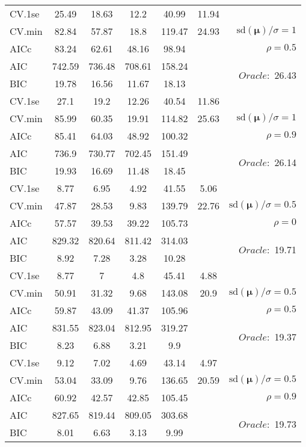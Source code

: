 \begin{table}
\begin{center}
\begin{tabular}{l*{5}{c}|r}
 \hline 
CV.1se & 25.49 & 18.63 & 12.2 & 40.99 & 11.94 & \\
CV.min & 82.84 & 57.87 & 18.8 & 119.47 & 24.93 &  $\mathrm{sd}(\mathbf{\mu})/\sigma=1$ \\
AICc & 83.24 & 62.61 & 48.16 & 98.94 & & $\rho=0.5$ \\
AIC & 742.59 & 736.48 & 708.61 & 158.24 & &  \multirow{2}{*}{$Oracle: $ 26.43} \\
BIC & 19.78 & 16.56 & 11.67 & 18.13 & &  \\
 \hline 
CV.1se & 27.1 & 19.2 & 12.26 & 40.54 & 11.86 & \\
CV.min & 85.99 & 60.35 & 19.91 & 114.82 & 25.63 &  $\mathrm{sd}(\mathbf{\mu})/\sigma=1$ \\
AICc & 85.41 & 64.03 & 48.92 & 100.32 & & $\rho=0.9$ \\
AIC & 736.9 & 730.77 & 702.45 & 151.49 & &  \multirow{2}{*}{$Oracle: $ 26.14} \\
BIC & 19.93 & 16.69 & 11.48 & 18.45 & &  \\
 \hline 
CV.1se & 8.77 & 6.95 & 4.92 & 41.55 & 5.06 & \\
CV.min & 47.87 & 28.53 & 9.83 & 139.79 & 22.76 &  $\mathrm{sd}(\mathbf{\mu})/\sigma=0.5$ \\
AICc & 57.57 & 39.53 & 39.22 & 105.73 & & $\rho=0$ \\
AIC & 829.32 & 820.64 & 811.42 & 314.03 & &  \multirow{2}{*}{$Oracle: $ 19.71} \\
BIC & 8.92 & 7.28 & 3.28 & 10.28 & &  \\
 \hline 
CV.1se & 8.77 & 7 & 4.8 & 45.41 & 4.88 & \\
CV.min & 50.91 & 31.32 & 9.68 & 143.08 & 20.9 &  $\mathrm{sd}(\mathbf{\mu})/\sigma=0.5$ \\
AICc & 59.87 & 43.09 & 41.37 & 105.96 & & $\rho=0.5$ \\
AIC & 831.55 & 823.04 & 812.95 & 319.27 & &  \multirow{2}{*}{$Oracle: $ 19.37} \\
BIC & 8.23 & 6.88 & 3.21 & 9.9 & &  \\
 \hline 
CV.1se & 9.12 & 7.02 & 4.69 & 43.14 & 4.97 & \\
CV.min & 53.04 & 33.09 & 9.76 & 136.65 & 20.59 &  $\mathrm{sd}(\mathbf{\mu})/\sigma=0.5$ \\
AICc & 60.92 & 42.57 & 42.85 & 105.45 & & $\rho=0.9$ \\
AIC & 827.65 & 819.44 & 809.05 & 303.68 & &  \multirow{2}{*}{$Oracle: $ 19.73} \\
BIC & 8.01 & 6.63 & 3.13 & 9.99 & &  \\
 \hline 
\end{tabular}
\end{center}
\vspace{-1cm}
\end{table}




